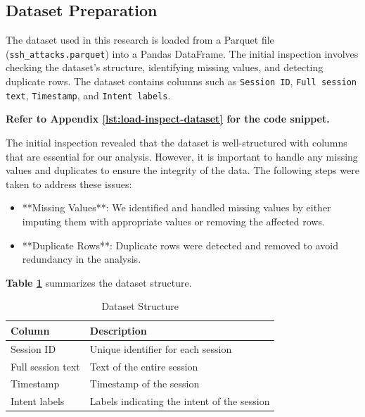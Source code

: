     \subsection{Dataset Preparation}
    
        The dataset used in this research is loaded from a Parquet file (\texttt{ssh\_attacks.parquet}) into a Pandas DataFrame. The initial inspection involves checking the dataset's structure, identifying missing values, and detecting duplicate rows. The dataset contains columns such as \texttt{Session ID}, \texttt{Full session text}, \texttt{Timestamp}, and \texttt{Intent labels}.
        
        \textbf{Refer to Appendix \ref{lst:load-inspect-dataset} for the code snippet.}

        The initial inspection revealed that the dataset is well-structured with columns that are essential for our analysis. However, it is important to handle any missing values and duplicates to ensure the integrity of the data. The following steps were taken to address these issues:

        \begin{itemize}
            \item **Missing Values**: We identified and handled missing values by either imputing them with appropriate values or removing the affected rows.
            \item **Duplicate Rows**: Duplicate rows were detected and removed to avoid redundancy in the analysis.
        \end{itemize}

        \textbf{Table \ref{tab:dataset-structure}} summarizes the dataset structure.

        \begin{table}[h]
            \centering
            \begin{tabular}{|l|l|}
                \hline
                \textbf{Column} & \textbf{Description} \\ \hline
                Session ID & Unique identifier for each session \\ \hline
                Full session text & Text of the entire session \\ \hline
                Timestamp & Timestamp of the session \\ \hline
                Intent labels & Labels indicating the intent of the session \\ \hline
            \end{tabular}
            \vspace{1em}
            \caption{Dataset Structure}
            \label{tab:dataset-structure}
        \end{table}

